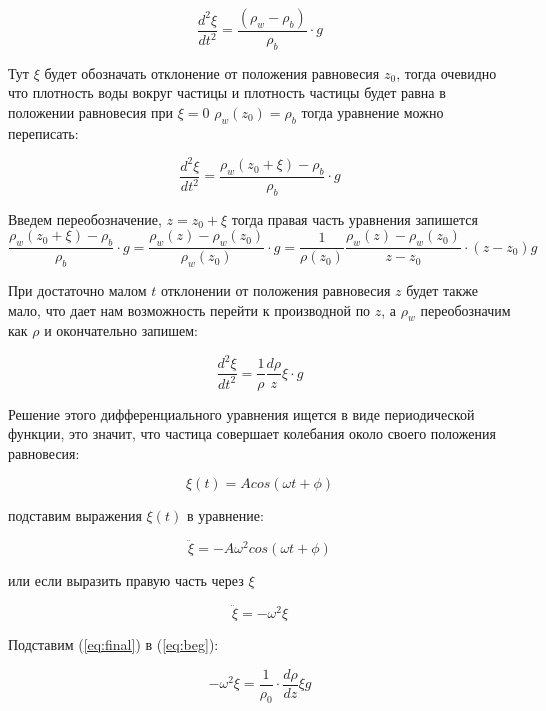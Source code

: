 \begin{equation}
    \frac{d^2 \xi}{dt^2} = \frac{(\rho_w-\rho_b)}{\rho_b}\cdot g
\end{equation}

Тут $\xi$ будет обозначать отклонение от положения равновесия $z_0$, тогда очевидно что плотность воды вокруг частицы и плотность частицы будет равна в положении равновесия при $\xi=0$ $\rho_w(z_0)=\rho_b$ тогда уравнение можно переписать:

\begin{equation}
    \frac{d^2 \xi}{dt^2} = \frac{\rho_w(z_0+\xi)-\rho_b}{\rho_b}\cdot g
    \label{eq:beg}
\end{equation}

Введем переобозначение, $z=z_0+\xi$ тогда правая часть уравнения запишется $$\frac{\rho_w(z_0+\xi)-\rho_b}{\rho_b}\cdot g = \frac{\rho_w(z)-\rho_w(z_0)}{\rho_w(z_0)}\cdot g = \frac{1}{\rho(z_0)} \frac{\rho_w(z)-\rho_w(z_0)}{z-z_0}\cdot(z-z_0) g$$

При достаточно малом $t$ отклонении от положения равновесия $z$ будет также мало, что дает нам возможность перейти к производной по $z$, а $\rho_w$ переобозначим как $\rho$ и окончательно запишем:

\begin{equation}
    \frac{d^2 \xi}{dt^2} =\frac{1}{\rho} \frac{d\rho}{z}\xi \cdot g
\end{equation}

Решение этого дифференциального уравнения ищется в виде периодической функции, это значит, что частица совершает колебания около своего положения равновесия:

\begin{equation}
    \xi(t)=A cos(\omega t + \phi)
\end{equation}

подставим выражения $\xi(t)$ в уравнение:

\begin{equation}
    \ddot{\xi} = - A \omega^2 cos(\omega t + \phi )
\end{equation}

или если выразить правую часть через $\xi$

\begin{equation}
    \ddot{\xi} = - \omega^2  \xi
    \label{eq:final}
\end{equation}

Подставим (\ref{eq:final}) в (\ref{eq:beg}):

\begin{equation}
    -\omega^2 \xi = \frac{1}{\rho_0}\cdot \frac{d \rho}{d z} \xi g
\end{equation}


